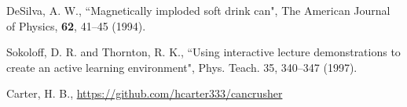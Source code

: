 \documentclass[prb,preprint]{revtex4-1}
\begin{document}
\begin{thebibliography}{99}

 DeSilva, A. W., ``Magnetically imploded soft drink can", The American Journal of Physics, \textbf{62}, 41--45 (1994).  

 Sokoloff, D. R. and Thornton, R. K., ``Using interactive lecture demonstrations to create an active learning environment", Phys. Teach. 35, 340--347 (1997).  

 Carter, H. B., \url{https://github.com/hcarter333/cancrusher}


\end{thebibliography}



\end{document}
